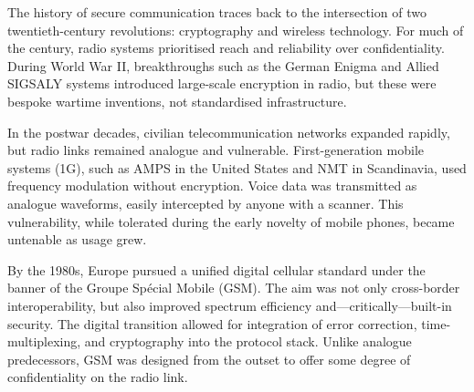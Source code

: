 \begin{historical}
The history of secure communication traces back to the intersection of two twentieth-century revolutions: cryptography and wireless technology. For much of the century, radio systems prioritised reach and reliability over confidentiality. During World War II, breakthroughs such as the German Enigma and Allied SIGSALY systems introduced large-scale encryption in radio, but these were bespoke wartime inventions, not standardised infrastructure.

In the postwar decades, civilian telecommunication networks expanded rapidly, but radio links remained analogue and vulnerable. First-generation mobile systems (1G), such as AMPS in the United States and NMT in Scandinavia, used frequency modulation without encryption. Voice data was transmitted as analogue waveforms, easily intercepted by anyone with a scanner. This vulnerability, while tolerated during the early novelty of mobile phones, became untenable as usage grew.

By the 1980s, Europe pursued a unified digital cellular standard under the banner of the Groupe Spécial Mobile (GSM). The aim was not only cross-border interoperability, but also improved spectrum efficiency and—critically—built-in security. The digital transition allowed for integration of error correction, time-multiplexing, and cryptography into the protocol stack. Unlike analogue predecessors, GSM was designed from the outset to offer some degree of confidentiality on the radio link.
\end{historical}
